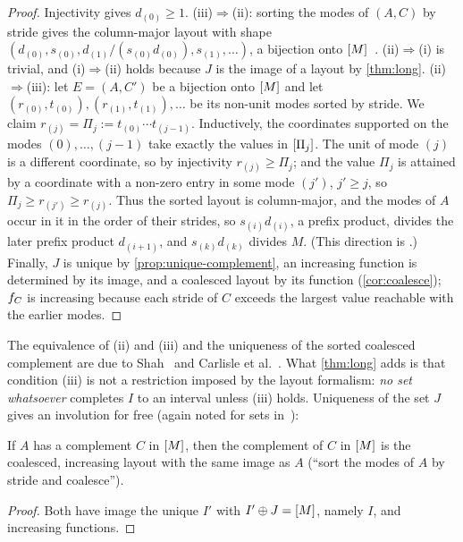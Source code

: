 \begin{proof}
Injectivity gives $d_{(0)}\ge1$.
(iii)$\Rightarrow$(ii): sorting the modes of $(A,C)$ by stride gives the column-major layout with
shape $(d_{(0)},s_{(0)},d_{(1)}/(s_{(0)}d_{(0)}),s_{(1)},\dots)$, a bijection onto
$[M]$~\cite[Prop.~2.7]{shah2024}. (ii)$\Rightarrow$(i) is trivial, and (i)$\Rightarrow$(ii)
holds because $J$ is the image of a layout by \cref{thm:long}.
(ii)$\Rightarrow$(iii): let $E=(A,C')$ be a bijection onto $[M]$ and let
$(r_{(0)},t_{(0)}),(r_{(1)},t_{(1)}),\dots$ be its non-unit modes sorted by stride. We claim
$r_{(j)}=\Pi_j:=t_{(0)}\cdots t_{(j-1)}$. Inductively, the coordinates supported on the modes
$(0),\dots,(j-1)$ take exactly the values in $[\Pi_j]$. The unit of mode $(j)$ is a different
coordinate, so by injectivity $r_{(j)}\ge\Pi_j$; and the value $\Pi_j$ is attained by a coordinate
with a non-zero entry in some mode $(j')$, $j'\ge j$, so $\Pi_j\ge r_{(j')}\ge r_{(j)}$. Thus the
sorted layout is column-major, and the modes of $A$ occur in it in the order of their strides, so
$s_{(i)}d_{(i)}$, a prefix product, divides the later prefix product $d_{(i+1)}$, and
$s_{(k)}d_{(k)}$ divides $M$. (This direction is \cite[Prop.~2.1.6.32]{carlisle2026}.)
Finally, $J$ is unique by \cref{prop:unique-complement}, an increasing function is determined by
its image, and a coalesced layout by its function (\cref{cor:coalesce}); $f_{C}$ is increasing
because each stride of $C$ exceeds the largest value reachable with the earlier modes.
\end{proof}

The equivalence of (ii) and (iii) and the uniqueness of the sorted coalesced complement are due
to Shah~\cite{shah2024} and Carlisle et al.~\cite{carlisle2026}. What \cref{thm:long} adds is
that condition (iii) is not a restriction imposed by the layout formalism: \emph{no set
whatsoever} completes $I$ to an interval unless (iii) holds. Uniqueness of the set $J$ gives an
involution for free (again noted for sets in~\cite{bodini2006}):

\begin{corollary}\label{cor:double}
If $A$ has a complement $C$ in $[M]$, then the complement of $C$ in $[M]$ is the
coalesced, increasing layout with the same image as $A$ (``sort the modes of $A$ by stride and
coalesce'').
\end{corollary}
\begin{proof}
Both have image the unique $I'$ with $I'\oplus J=[M]$, namely $I$, and increasing functions.
\end{proof}

